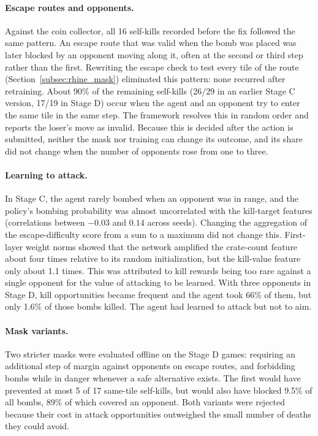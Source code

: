 \documentclass[11pt,a4paper]{report}
\begin{document}
	\paragraph{Escape routes and opponents.} Against the coin collector, all 16 self-kills recorded before the fix followed the same pattern. An escape route that was valid when the bomb was placed was later blocked by an opponent moving along it, often at the second or third step rather than the first. Rewriting the escape check to test every tile of the route (Section~\ref{subsec:rhine_mask}) eliminated this pattern: none recurred after retraining. About 90\% of the remaining self-kills (26/29 in an earlier Stage C version, 17/19 in Stage D) occur when the agent and an opponent try to enter the same tile in the same step. The framework resolves this in random order and reports the loser's move as invalid. Because this is decided after the action is submitted, neither the mask nor training can change its outcome, and its share did not change when the number of opponents rose from one to three.
	
	\paragraph{Learning to attack.} In Stage C, the agent rarely bombed when an opponent was in range, and the policy's bombing probability was almost uncorrelated with the kill-target features (correlations between $-0.03$ and $0.14$ across seeds). Changing the aggregation of the escape-difficulty score from a sum to a maximum did not change this. First-layer weight norms showed that the network amplified the crate-count feature about four times relative to its random initialization, but the kill-value feature only about 1.1 times. This was attributed to kill rewards being too rare against a single opponent for the value of attacking to be learned. With three opponents in Stage D, kill opportunities became frequent and the agent took 66\% of them, but only 1.6\% of those bombs killed. The agent had learned to attack but not to aim.
	
	\paragraph{Mask variants.} Two stricter masks were evaluated offline on the Stage D games: requiring an additional step of margin against opponents on escape routes, and forbidding bombs while in danger whenever a safe alternative exists. The first would have prevented at most 5 of 17 same-tile self-kills, but would also have blocked 9.5\% of all bombs, 89\% of which covered an opponent. Both variants were rejected because their cost in attack opportunities outweighed the small number of deaths they could avoid.
	
\end{document}
